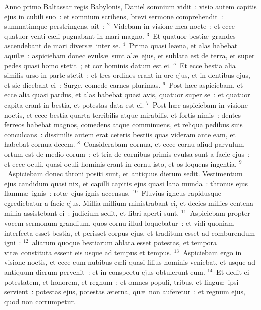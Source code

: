 \bchapter
\lettrine[lines=3,image=true,loversize=0.05,lraise=-0.03]{A}{}nno primo Baltassar regis Babylonis, Daniel somnium vidit~: visio autem capitis ejus in cubili suo~: et somnium scribens, brevi sermone comprehendit~: summatimque perstringens, ait~:
${}^{2}$~Videbam in visione mea nocte~: et ecce quatuor venti c\ae li pugnabant in mari magno.
${}^{3}$~Et quatuor besti\ae\ grandes ascendebant de mari divers\ae\ inter se.
${}^{4}$~Prima quasi le\ae na, et alas habebat aquil\ae~: aspiciebam donec evuls\ae\ sunt al\ae\ ejus, et sublata est de terra, et super pedes quasi homo stetit~; et cor hominis datum est ei.
${}^{5}$~Et ecce bestia alia similis urso in parte stetit~: et tres ordines erant in ore ejus, et in dentibus ejus, et sic dicebant ei~: Surge, comede carnes plurimas.
${}^{6}$~Post h\ae c aspiciebam, et ecce alia quasi pardus, et alas habebat quasi avis, quatuor super se~: et quatuor capita erant in bestia, et potestas data est ei.
${}^{7}$~Post h\ae c aspiciebam in visione noctis, et ecce bestia quarta terribilis atque mirabilis, et fortis nimis~: dentes ferreos habebat magnos, comedens atque comminuens, et reliqua pedibus suis conculcans~: dissimilis autem erat ceteris bestiis quas videram ante eam, et habebat cornua decem.
${}^{8}$~Considerabam cornua, et ecce cornu aliud parvulum ortum est de medio eorum~: et tria de cornibus primis evulsa sunt a facie ejus~: et ecce oculi, quasi oculi hominis erant in cornu isto, et os loquens ingentia.
${}^{9}$~Aspiciebam donec throni positi sunt, et antiquus dierum sedit. Vestimentum ejus candidum quasi nix, et capilli capitis ejus quasi lana munda~: thronus ejus flamm\ae\ ignis~: rot\ae\ ejus ignis accensus.
${}^{10}$~Fluvius igneus rapidusque egrediebatur a facie ejus. Millia millium ministrabant ei, et decies millies centena millia assistebant ei~: judicium sedit, et libri aperti sunt.
${}^{11}$~Aspiciebam propter vocem sermonum grandium, quos cornu illud loquebatur~: et vidi quoniam interfecta esset bestia, et perisset corpus ejus, et traditum esset ad comburendum igni~:
${}^{12}$~aliarum quoque bestiarum ablata esset potestas, et tempora vit\ae\ constituta essent eis usque ad tempus et tempus.
${}^{13}$~Aspiciebam ergo in visione noctis, et ecce cum nubibus c\ae li quasi filius hominis veniebat, et usque ad antiquum dierum pervenit~: et in conspectu ejus obtulerunt eum.
${}^{14}$~Et dedit ei potestatem, et honorem, et regnum~: et omnes populi, tribus, et lingu\ae\ ipsi servient~: potestas ejus, potestas \ae terna, qu\ae\ non auferetur~: et regnum ejus, quod non corrumpetur.


